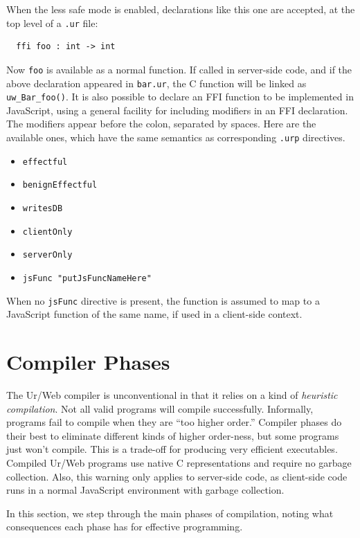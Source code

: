 \documentclass{article}
\begin{document}
When the less safe mode is enabled, declarations like this one are accepted, at the top level of a \texttt{.ur} file:
\begin{verbatim}
  ffi foo : int -> int
\end{verbatim}

Now \texttt{foo} is available as a normal function.  If called in server-side code, and if the above declaration appeared in \texttt{bar.ur}, the C function will be linked as \texttt{uw\_Bar\_foo()}.  It is also possible to declare an FFI function to be implemented in JavaScript, using a general facility for including modifiers in an FFI declaration.  The modifiers appear before the colon, separated by spaces.  Here are the available ones, which have the same semantics as corresponding \texttt{.urp} directives.
\begin{itemize}
\item \texttt{effectful}
\item \texttt{benignEffectful}
\item \texttt{writesDB}
\item \texttt{clientOnly}
\item \texttt{serverOnly}
\item \texttt{jsFunc "putJsFuncNameHere"}
\end{itemize}

When no \texttt{jsFunc} directive is present, the function is assumed to map to a JavaScript function of the same name, if used in a client-side context.


\section{\label{phases}Compiler Phases}

The Ur/Web compiler is unconventional in that it relies on a kind of \emph{heuristic compilation}.  Not all valid programs will compile successfully.  Informally, programs fail to compile when they are ``too higher order.''  Compiler phases do their best to eliminate different kinds of higher order-ness, but some programs just won't compile.  This is a trade-off for producing very efficient executables.  Compiled Ur/Web programs use native C representations and require no garbage collection.  Also, this warning only applies to server-side code, as client-side code runs in a normal JavaScript environment with garbage collection.

In this section, we step through the main phases of compilation, noting what consequences each phase has for effective programming.
\end{document}
